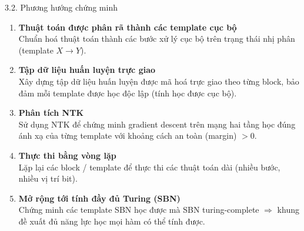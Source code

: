 \documentclass[10pt, aspectratio=169]{beamer}
\begin{document}
\begin{frame}{3.2. Phương hướng chứng minh}

    \begin{enumerate}
        \item \textbf{Thuật toán được phân rã thành các template cục bộ}\\
        Chuẩn hoá thuật toán thành các bước xử lý cục bộ trên trạng thái nhị phân
        (template $X \rightarrow Y$).

        \item \textbf{Tập dữ liệu huấn luyện trực giao}\\
        Xây dựng tập dữ liệu huấn luyện được mã hoá trực giao theo từng block,
        bảo đảm mỗi template được học độc lập (tính học được cục bộ).

        \item \textbf{Phân tích NTK}\\
        Sử dụng NTK để chứng minh gradient descent trên mạng hai tầng
        học đúng ánh xạ của từng template với khoảng cách an toàn (margin) $> 0$.

        \item \textbf{Thực thi bằng vòng lặp}\\
        Lặp lại các block / template để thực thi các thuật toán dài
        (nhiều bước, nhiều vị trí bit).

        \item \textbf{Mở rộng tới tính đầy đủ Turing (SBN)}\\
        Chứng minh các template SBN học được mà SBN turing-complete
        $\Rightarrow$ khung đề xuất đủ năng lực học mọi hàm có thể tính được.
    \end{enumerate}

\end{frame}
\end{document}
